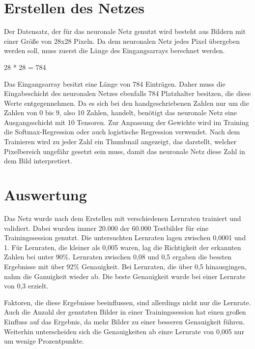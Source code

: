 \section{Erstellen des Netzes}
\label{sec:erstellenDesNetzes}
\printsubchapterauthor{\authorNiklas}
Der Datensatz, der für das neuronale Netz genutzt wird besteht aus Bildern mit einer Größe von 28x28 Pixeln. Da dem neuronalen Netz jedes Pixel übergeben werden soll, muss zuerst die Länge des Eingangsarrays berechnet werden.
\begin{center} 28 * 28 = 784\end{center}
Das Eingangsarray besitzt eine Länge von 784 Einträgen. Daher muss die Eingabeschicht des neuronalen Netzes ebenfalls 784 Platzhalter besitzen, die diese Werte entgegennehmen. Da es sich bei den handgeschriebenen Zahlen nur um die Zahlen von 0 bis 9, also 10 Zahlen, handelt, benötigt das neuronale Netz eine Ausgangsschicht mit 10 Tensoren. Zur Anpassung der Gewichte wird im Training die Softmax-Regression oder auch logistische Regression verwendet. Nach dem Trainieren wird zu jeder Zahl ein Thumbnail angezeigt, das darstellt, welcher Pixelbereich ungefähr gesetzt sein muss, damit das neuronale Netz diese Zahl in dem Bild interpretiert.

\section{Auswertung}
\label{sec:auswertung}
\printsubchapterauthor{\authorMarco}
Das Netz wurde nach dem Erstellen mit verschiedenen Lernraten trainiert und validiert. Dabei wurden immer 20.000 der 60.000 Testbilder für eine Trainingssession genutzt. Die untersuchten Lernraten lagen zwischen 0,0001 und 1. Für Lernraten, die kleiner als 0,005 waren, lag die Richtigkeit der erkannten Zahlen bei unter 90\%. Lernraten zwischen 0,08 und 0,5 ergaben die bessten Ergebnisse mit über 92\% Genauigkeit. Bei Lernraten, die über 0,5 hinausgingen, nahm die Ganuigkeit wieder ab. Die beste Genauigkeit wurde bei einer Lernrate von 0,3 erzielt.

Faktoren, die diese Ergebnisse beeinflussen, sind allerdings nicht nur die Lernrate. Auch die Anzahl der genutzten Bilder in einer Trainingssession hat einen großen Einfluss auf das Ergebnis, da mehr Bilder zu einer besseren Genauigkeit führen. Weiterhin unterscheiden sich die Genauigkeiten ab einre Lernrate von 0,005 nur um wenige Prozentpunkte.

